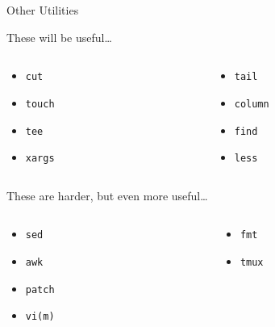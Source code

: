 \documentclass[table,dvipsnames]{beamer}
\begin{document}
\begin{frame}{Other Utilities}
	\begin{block}{These will be useful\dots}
		\begin{columns}
			\begin{column}[T]{0.45\textwidth}
				\begin{itemize}
					\item \texttt{cut}
					\item \texttt{touch}
					\item \texttt{tee}
					\item \texttt{xargs}
				\end{itemize}
			\end{column}
			\begin{column}[T]{0.45\textwidth}
				\begin{itemize}
					\item \texttt{tail}
					\item \texttt{column}
					\item \texttt{find}
					\item \texttt{less}
				\end{itemize}
			\end{column}
		\end{columns}
	\end{block}
	\begin{block}{These are harder, but even more useful\dots}
		\begin{columns}
			\begin{column}[T]{0.45\textwidth}
				\begin{itemize}
					\item \texttt{sed}
					\item \texttt{awk}
					\item \texttt{patch}
					\item \texttt{vi(m)}
				\end{itemize}
			\end{column}
			\begin{column}[T]{0.45\textwidth}
				\begin{itemize}
					\item \texttt{fmt}
					\item \texttt{tmux} 
				\end{itemize}
			\end{column}
		\end{columns}
	\end{block}
\end{frame}
\end{document}
